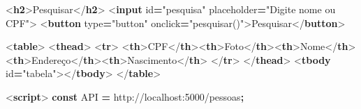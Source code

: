 \documentclass[
]{book}
\newenvironment{Shaded}{\begin{snugshade}}{\end{snugshade}}
\newcommand{\DataTypeTok}[1]{\textcolor[rgb]{0.13,0.29,0.53}{#1}}
\newcommand{\KeywordTok}[1]{\textcolor[rgb]{0.13,0.29,0.53}{\textbf{#1}}}
\newcommand{\NormalTok}[1]{#1}
\newcommand{\OperatorTok}[1]{\textcolor[rgb]{0.81,0.36,0.00}{\textbf{#1}}}
\newcommand{\OtherTok}[1]{\textcolor[rgb]{0.56,0.35,0.01}{#1}}
\newcommand{\StringTok}[1]{\textcolor[rgb]{0.31,0.60,0.02}{#1}}
\begin{document}
\begin{Shaded}
\begin{Highlighting}[]
\DataTypeTok{\textless{}}\KeywordTok{h2}\DataTypeTok{\textgreater{}}\NormalTok{Pesquisar}\DataTypeTok{\textless{}/}\KeywordTok{h2}\DataTypeTok{\textgreater{}}
\DataTypeTok{\textless{}}\KeywordTok{input}\OtherTok{ id}\OperatorTok{=}\StringTok{"pesquisa"}\OtherTok{ placeholder}\OperatorTok{=}\StringTok{"Digite nome ou CPF"}\DataTypeTok{\textgreater{}}
\DataTypeTok{\textless{}}\KeywordTok{button}\OtherTok{ type}\OperatorTok{=}\StringTok{"button"}\OtherTok{ onclick}\OperatorTok{=}\StringTok{"pesquisar()"}\DataTypeTok{\textgreater{}}\NormalTok{Pesquisar}\DataTypeTok{\textless{}/}\KeywordTok{button}\DataTypeTok{\textgreater{}}

\DataTypeTok{\textless{}}\KeywordTok{table}\DataTypeTok{\textgreater{}}
  \DataTypeTok{\textless{}}\KeywordTok{thead}\DataTypeTok{\textgreater{}}
    \DataTypeTok{\textless{}}\KeywordTok{tr}\DataTypeTok{\textgreater{}}
      \DataTypeTok{\textless{}}\KeywordTok{th}\DataTypeTok{\textgreater{}}\NormalTok{CPF}\DataTypeTok{\textless{}/}\KeywordTok{th}\DataTypeTok{\textgreater{}\textless{}}\KeywordTok{th}\DataTypeTok{\textgreater{}}\NormalTok{Foto}\DataTypeTok{\textless{}/}\KeywordTok{th}\DataTypeTok{\textgreater{}\textless{}}\KeywordTok{th}\DataTypeTok{\textgreater{}}\NormalTok{Nome}\DataTypeTok{\textless{}/}\KeywordTok{th}\DataTypeTok{\textgreater{}}
      \DataTypeTok{\textless{}}\KeywordTok{th}\DataTypeTok{\textgreater{}}\NormalTok{Endereço}\DataTypeTok{\textless{}/}\KeywordTok{th}\DataTypeTok{\textgreater{}\textless{}}\KeywordTok{th}\DataTypeTok{\textgreater{}}\NormalTok{Nascimento}\DataTypeTok{\textless{}/}\KeywordTok{th}\DataTypeTok{\textgreater{}}
    \DataTypeTok{\textless{}/}\KeywordTok{tr}\DataTypeTok{\textgreater{}}
  \DataTypeTok{\textless{}/}\KeywordTok{thead}\DataTypeTok{\textgreater{}}
  \DataTypeTok{\textless{}}\KeywordTok{tbody}\OtherTok{ id}\OperatorTok{=}\StringTok{"tabela"}\DataTypeTok{\textgreater{}\textless{}/}\KeywordTok{tbody}\DataTypeTok{\textgreater{}}
\DataTypeTok{\textless{}/}\KeywordTok{table}\DataTypeTok{\textgreater{}}

\DataTypeTok{\textless{}}\KeywordTok{script}\DataTypeTok{\textgreater{}}
\KeywordTok{const}\NormalTok{ API }\OperatorTok{=} \StringTok{\textquotesingle{}http://localhost:5000/pessoas\textquotesingle{}}\OperatorTok{;}


\end{Highlighting}
\end{Shaded}
\end{document}
